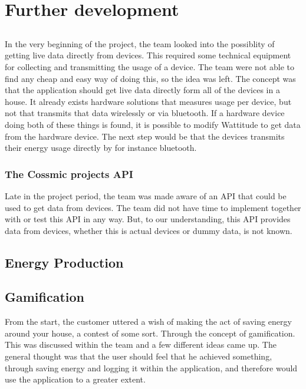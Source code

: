 \chapter{Further development}
\label{sec:further}
\section{}
In the very beginning of the project, the team looked into the possiblity of getting live data directly from devices. This required some technical equipment for collecting and transmitting the usage of a device. The team were not able to find any cheap and easy way of doing this, so the idea was left. The concept was that the application should get live data directly form all of the devices in a house. It already exists hardware solutions that measures usage per device, but not that transmits that data wirelessly or via bluetooth. If a hardware device doing both of these things is found, it is possible to modify Wattitude to get data from the hardware device. The next step would be that the devices transmits their energy usage directly by for instance bluetooth. 

\subsection{The Cossmic projects API}
Late in the project period, the team was made aware of an API that could be used to get data from devices. The team did not have time to implement together with or test this API in any way. But, to our understanding, this API provides data from devices, whether this is actual devices or dummy data, is not known. 

\section{Energy Production}

\section{Gamification}
From the start, the customer uttered a wish of making the act of saving energy around your house, a contest of some sort. Through the concept of gamification. This was discussed within the team and a few different ideas came up. The general thought was that the user should feel that he achieved something, through saving energy and logging it within the application, and therefore would use the application to a greater extent. 

